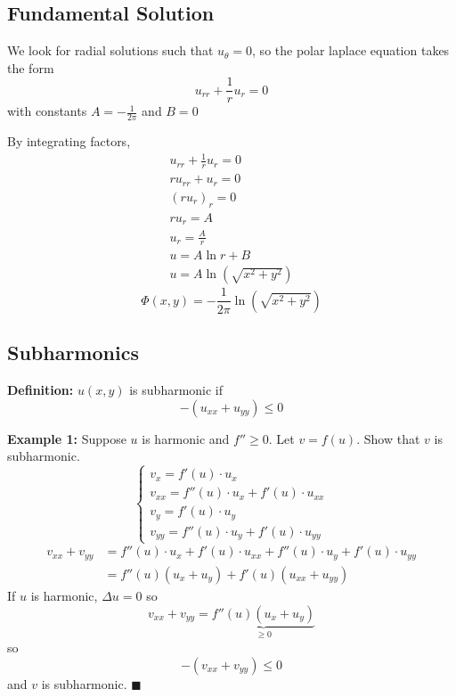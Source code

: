 \documentclass[10pt]{article}
\begin{document}
\subsection{Fundamental Solution}
We look for radial solutions such that $u_{\theta}= 0$, so the polar laplace equation takes the form 
\[u_{rr} + \frac{1}{r}u_r = 0\]
with constants $A = -\frac{1}{2\pi}$ and $B =0$ 

By integrating factors, 
\begin{gather*}
    u_{rr} + \frac{1}{r}u_r = 0\\
    ru_{rr} + u_r =0\\
    (ru_r)_r = 0\\
    ru_r = A\\
    u_r = \frac{A}{r}\\
    u = A\ln r + B\\
    u = A\ln(\sqrt{x^2 + y^2})
\end{gather*}
\[\Phi(x, y) = -\frac{1}{2\pi}\ln(\sqrt{x^2 + y^2})\]

\subsection{Subharmonics}
\textbf{Definition:} $u(x, y)$ is subharmonic if 
\[-(u_{xx} + u_{yy}) \leq 0\]

\textbf{Example 1:} Suppose $u$ is harmonic and $f'' \geq 0$. Let $v = f(u)$. Show that $v$ is subharmonic. 
\[\begin{cases*}
    v_x = f'(u)\cdot u_x\\
    v_{xx} = f''(u)\cdot u_x + f'(u)\cdot u_{xx}\\
    v_y = f'(u)\cdot u_y\\
    v_{yy} = f''(u)\cdot u_y + f'(u)\cdot u_{yy}
\end{cases*}\]
\begin{align*}
    v_{xx} + v_{yy} &= f''(u)\cdot u_x + f'(u)\cdot u_{xx} + f''(u)\cdot u_y + f'(u)\cdot u_{yy}\\
    &= f''(u)(u_x + u_y) + f'(u)(u_{xx} + u_{yy})
\end{align*}
If $u$ is harmonic, $\Delta u = 0$ so 
\[v_{xx} + v_{yy} = \underbrace{f''(u)(u_x + u_y)}_{\geq 0}\]
so 
\[-(v_{xx} + v_{yy}) \leq 0\]
and $v$ is subharmonic. \quad $\blacksquare$
\end{document}
